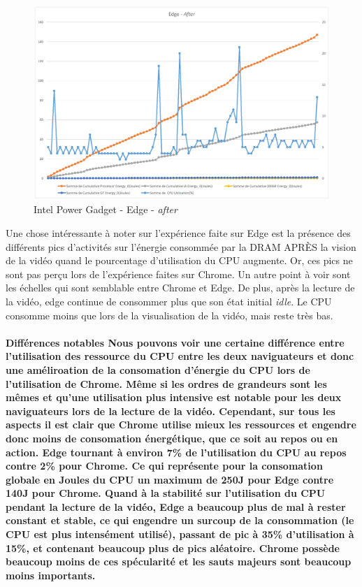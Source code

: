 \documentclass[12pt, a4paper]{report}
\begin{document}
\begin{figure}[H]
    \includegraphics[width=1\linewidth]{res//graph/IntelPowerGadget/edge-after.png}
    \caption{Intel Power Gadget - Edge - \textit{after}}
    \label{fig:ipg_edge-after}
\end{figure}

Une chose intéressante à noter sur l'expérience faite sur Edge est la présence des différents pics d'activités sur l'énergie consommée par la DRAM APRÈS la vision de la vidéo quand le pourcentage d'utilisation du CPU augmente. Or, ces pics ne sont pas perçu lors de l'expérience faites sur Chrome. 
Un autre point à voir sont les échelles qui sont semblable entre Chrome et Edge. 
De plus, après la lecture de la vidéo, edge continue de consommer plus que son état initial \textit{idle}. Le CPU consomme moins que lors de la visualisation de la vidéo, mais reste très bas.

\paragraph{
\textbf{Différences notables}\newline
Nous pouvons voir une certaine différence entre l'utilisation des ressource du CPU entre les deux naviguateurs et donc une améliroation de la consomation d'énergie du CPU lors de l'utilisation de Chrome.
Même si les ordres de grandeurs sont les mêmes et qu'une utilisation plus intensive est notable pour les deux naviguateurs lors de la lecture de la vidéo. 
Cependant, sur tous les aspects il est clair que Chrome utilise mieux les ressources et engendre donc moins de consomation énergétique, que ce soit au repos ou en action. Edge tournant à environ 7\% de l'utilisation du CPU au repos contre 2\% pour Chrome. Ce qui représente pour la consomation globale en Joules du CPU un maximum de 250J pour Edge contre 140J pour Chrome. Quand à la stabilité sur l'utilisation du CPU pendant la lecture de la vidéo, Edge a beaucoup plus de mal à rester constant et stable, ce qui engendre un surcoup de la consommation (le CPU est plus intensément utilisé), passant de pic à 35\% d'utilisation à 15\%, et contenant beaucoup plus de pics aléatoire. Chrome possède beaucoup moins de ces spécularité et les sauts majeurs sont beaucoup moins importants. 
}
\end{document}
